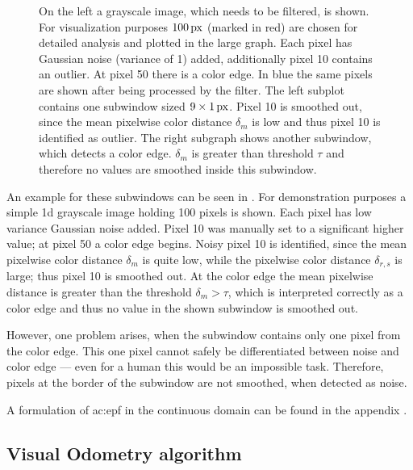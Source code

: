 \begin{figure}
  \centering
  
  \caption{On the left a grayscale image, which needs to be filtered, is shown. For visualization purposes $\unit[100]{px}$ (marked in red) are chosen for detailed analysis and plotted in the large graph. Each pixel has Gaussian noise (variance of 1) added, additionally pixel 10 contains an outlier. At pixel 50 there is a color edge. In blue the same pixels are shown after being processed by the filter. The left subplot contains one subwindow sized $\unit[9 \times 1]{px}$. Pixel 10 is smoothed out, since the mean pixelwise color distance $\delta_m$ is low and thus pixel 10 is identified as outlier. The right subgraph shows another subwindow, which detects a color edge. $\delta_m$ is greater than threshold $\tau$ and therefore no values are smoothed inside this subwindow.}
  \label{fig:sensor_method_example}
\end{figure}

An example for these subwindows can be seen in . 
For demonstration purposes a simple 1d grayscale image holding 100 pixels is shown. 
Each pixel has low variance Gaussian noise added. 
Pixel 10 was manually set to a significant higher value; at pixel 50 a color edge begins. 
Noisy pixel 10 is identified, since the mean pixelwise color distance $\delta_m$ is quite low, while the pixelwise color distance $\delta_{r,s}$ is large; thus pixel 10 is smoothed out. 
At the color edge the mean pixelwise distance is greater than the threshold $\delta_m > \tau$, which is interpreted correctly as a color edge and thus no value in the shown subwindow is smoothed out. 

However, one problem arises, when the subwindow contains only one pixel from the color edge. 
This one pixel cannot safely be differentiated between noise and color edge --- even for a human this would be an impossible task. 
Therefore, pixels at the border of the subwindow are not smoothed, when detected as noise.

A formulation of \gls{ac:epf} in the continuous domain can be found in the appendix .





\subsection{Visual Odometry algorithm}
\label{ssec:perception_methods_visualodometryalgorithm}




